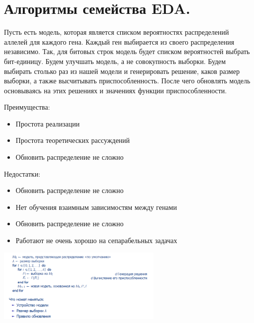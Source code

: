 \section{Алгоритмы семейства EDA.}

Пусть есть модель, которая является списком вероятностях распределений аллелей для каждого гена. Каждый ген выбирается из своего распределения независимо. Так, для битовых строк модель  будет списком вероятностей выбрать бит-единицу. Будем улучшать модель, а не совокупность выборки. Будем выбирать столько раз из нашей модели и генерировать решение, каков размер выборки, а также высчитывать приспособленность. После чего обновлять модель основываясь на этих решениях и значениях функции приспособленности.

Преимущества:
\begin{itemize}
      \item Простота реализации
      \item Простота теоретических рассуждений
      \item Обновить распределение не сложно
   \end{itemize}

Недостатки:
\begin{itemize}
      \item Обновить распределение не сложно
      \item Нет обучения взаимным зависимостям между генами
      \item Обновить распределение не сложно
      \item Работают не очень хорошо на сепарабельных задачах
   \end{itemize}

\includegraphics[width=8cm]{images/17bilet.png}  


